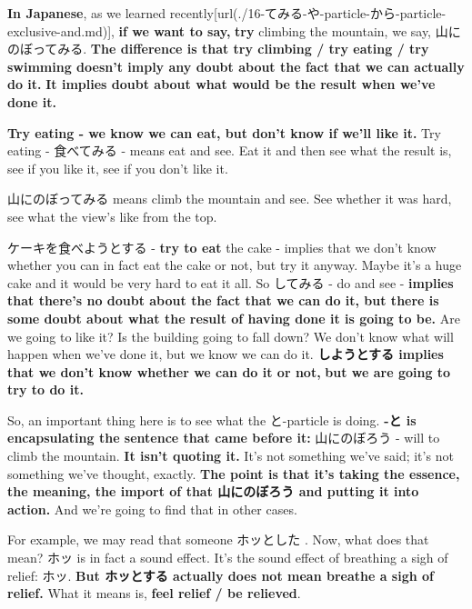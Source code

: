 {\bf In Japanese}, as we learned recently\goto{{[}16{]}}[url(./16-てみる-や-particle-から-particle-exclusive-and.md)], {\bf if we want to say,} {\bf try} climbing the mountain, we say, 山にのぼってみる. {\bf The difference is that try climbing / try eating / try swimming doesn't imply any doubt about the fact that we can actually do it.} {\bf It implies doubt about what would be the result when we've done it.}

\thinrule

{\bf Try eating - we know we can eat, but don't know if we'll like it.} Try eating - 食べてみる - means eat and see. Eat it and then see what the result is, see if you like it, see if you don't like it.

\thinrule

山にのぼってみる means climb the mountain and see. See whether it was hard, see what the view's like from the top.

\thinrule

ケーキを食べようとする - {\bf try to eat} the cake - implies that we don't know whether you can in fact eat the cake or not, but try it anyway. Maybe it's a huge cake and it would be very hard to eat it all. So してみる - do and see - {\bf implies that there's no doubt about the fact that we can do it, but there is some doubt about what the result of having done it is going to be.} Are we going to like it? Is the building going to fall down? We don't know what will happen when we've done it, but we know we can do it. {\bf しようとする implies that we don't know whether we can do it or not,} {\bf but we are going to try to do it.}

\thinrule

So, an important thing here is to see what the と-particle is doing. {\bf -と is encapsulating the sentence that came before it:} 山にのぼろう - will to climb the mountain. {\bf It isn't quoting it.} It's not something we've said; it's not something we've thought, exactly. {\bf The point is that it's taking the essence, the meaning, the import of that 山にのぼろう and putting it into action.} And we're going to find that in other cases.

{}

For example, we may read that someone ホッとした . Now, what does that mean? ホッ is in fact a sound effect. It's the sound effect of breathing a sigh of relief: ホッ. {\bf But ホッとする actually does not mean breathe a sigh of relief.} What it means is, {\bf feel relief / be relieved}.

